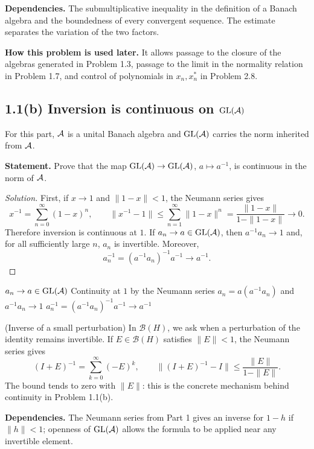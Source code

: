\noindent\textbf{Dependencies.} The submultiplicative inequality in the definition of a Banach algebra and the boundedness of every convergent sequence. The estimate separates the variation of the two factors.

\noindent\textbf{How this problem is used later.} It allows passage to the closure of the algebras generated in Problem 1.3, passage to the limit in the normality relation in Problem 1.7, and control of polynomials in $x_n,x_n^*$ in Problem 2.8.

\subsection*{1.1(b) Inversion is continuous on $\operatorname{GL}(\mathcal A)$}

For this part, $\mathcal A$ is a unital Banach algebra and $\operatorname{GL}(\mathcal A)$ carries the norm inherited from
$\mathcal A$.

\noindent\textbf{Statement.} Prove that the map $\operatorname{GL}(\mathcal A)\to\operatorname{GL}(\mathcal A)$, $a\mapsto a^{-1}$, is continuous in the norm of $\mathcal A$.

\begin{proof}[Solution]
First, if $x\to1$ and $\|1-x\|<1$, the Neumann series gives
\[
 x^{-1}=\sum_{n=0}^\infty(1-x)^n,
 \qquad
 \|x^{-1}-1\|
 \le \sum_{n=1}^\infty\|1-x\|^n
 =\frac{\|1-x\|}{1-\|1-x\|}\to0.
\]
Therefore inversion is continuous at $1$. If $a_n\to a\in\operatorname{GL}(\mathcal A)$, then
$a^{-1}a_n\to1$ and, for all sufficiently large $n$, $a_n$ is invertible. Moreover,
\[
 a_n^{-1}=(a^{-1}a_n)^{-1}a^{-1}\longrightarrow a^{-1}.
\]
\end{proof}

\proofdiagram
{$a_n\to a\in\operatorname{GL}(\mathcal A)$}
{Continuity at $1$ by the Neumann series}
{$a_n=a(a^{-1}a_n)$ and $a^{-1}a_n\to1$}
{$a_n^{-1}=(a^{-1}a_n)^{-1}a^{-1}\to a^{-1}$}

\begin{cthejemplo}{(Inverse of a small perturbation)}
In $\mathcal B(H)$, we ask when a perturbation of the identity remains invertible.
If $E\in\mathcal B(H)$ satisfies $\|E\|<1$, the Neumann series gives
\[
 (I+E)^{-1}=\sum_{k=0}^{\infty}(-E)^k,
 \qquad \|(I+E)^{-1}-I\|\le\frac{\|E\|}{1-\|E\|}.
\]
The bound tends to zero with $\|E\|$: this is the concrete mechanism behind continuity in Problem 1.1(b).
\end{cthejemplo}

\noindent\textbf{Dependencies.} The Neumann series from Part 1 gives an inverse for $1-h$ if $\|h\|<1$; openness of $\operatorname{GL}(\mathcal A)$ allows the formula to be applied near any invertible element.


